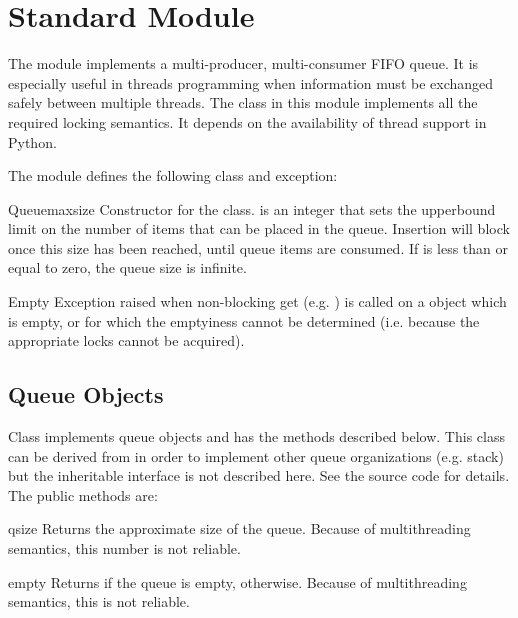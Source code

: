 \section{Standard Module }
\label{module-Queue}


The  module implements a multi-producer, multi-consumer
FIFO queue.  It is especially useful in threads programming when
information must be exchanged safely between multiple threads.  The
 class in this module implements all the required locking
semantics.  It depends on the availability of thread support in
Python.

The  module defines the following class and exception:


\begin{classdesc}{Queue}{maxsize}
Constructor for the class.   is an integer that sets the
upperbound limit on the number of items that can be placed in the
queue.  Insertion will block once this size has been reached, until
queue items are consumed.  If  is less than or equal to
zero, the queue size is infinite.
\end{classdesc}

\begin{excdesc}{Empty}
Exception raised when non-blocking get (e.g. ) is
called on a  object which is empty, or for which the
emptyiness cannot be determined (i.e. because the appropriate locks
cannot be acquired).
\end{excdesc}

\subsection{Queue Objects}
\label{QueueObjects}

Class  implements queue objects and has the methods
described below.  This class can be derived from in order to implement
other queue organizations (e.g. stack) but the inheritable interface
is not described here.  See the source code for details.  The public
methods are:

\begin{methoddesc}{qsize}{}
Returns the approximate size of the queue.  Because of multithreading
semantics, this number is not reliable.
\end{methoddesc}

\begin{methoddesc}{empty}{}
Returns  if the queue is empty,  otherwise.  Because
of multithreading semantics, this is not reliable.
\end{methoddesc}

